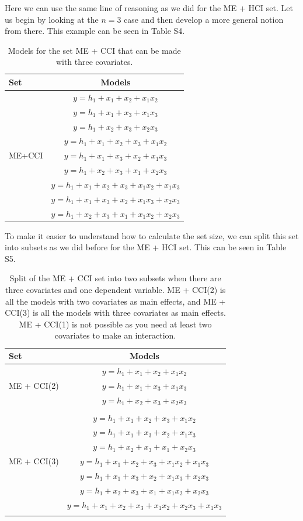 Here we can use the same line of reasoning as we did for the ME + HCI set. Let us begin by looking at the $n=3$ case and then develop a more general notion from there. This example can be seen in Table S4. 
\begin{table}{}
\centering
\caption{Models for the set ME + CCI that can be made with three covariates.}
\begin{tabular}{lc} \hline
\toprule
Set & Models \\
\midrule
\multirow{9}{*}{ME+CCI} & $y=h_1+x_1+x_2+x_1x_2$\\ & $y=h_1+x_1+x_3+x_1x_3$\\ & $y=h_1+x_2+x_3+x_2x_3$\\ & $y=h_1+x_1+x_2+x_3+x_1x_2$\\ & $y=h_1+x_1+x_3+x_2+x_1x_3$\\ & $y=h_1+x_2+x_3+x_1+x_2x_3$\\ & $y=h_1+x_1+x_2+x_3+x_1x_2+x_1x_3$\\ & $y=h_1+x_1+x_3+x_2+x_1x_3+x_2x_3$\\ & $y=h_1+x_2+x_3+x_1+x_1x_2+x_2x_3$ \\
\bottomrule
\end{tabular}
\end{table}
To make it easier to understand how to calculate the set size, we can split this set into subsets as we did before for the ME + HCI set. This can be seen in Table S5.

\begin{table}
\centering
\caption{Split of the ME + CCI set into two subsets when there are three covariates and one dependent variable. ME + CCI(2) is all the models with two covariates as main effects, and ME + CCI(3) is all the models with three covariates as main effects. ME + CCI(1) is not possible as you need at least two covariates to make an interaction.}
\begin{tabular}{lc} 
\toprule
Set & Models \\ 
\midrule
\multirow{3}{*}{ME + CCI(2)} & $y=h_1+x_1+x_2+x_1x_2$\\ & $y=h_1+x_1+x_3+x_1x_3$\\ & $y=h_1+x_2+x_3+x_2x_3$\\ &  \\  
\multirow{7}{*}{ME + CCI(3)} & $y=h_1+x_1+x_2+x_3+x_1x_2$\\ & $y=h_1+x_1+x_3+x_2+x_1x_3$\\ & $y=h_1+x_2+x_3+x_1+x_2x_3$\\ & $y=h_1+x_1+x_2+x_3+x_1x_2+x_1x_3$\\ & $y=h_1+x_1+x_3+x_2+x_1x_3+x_2x_3$\\ & $y=h_1+x_2+x_3+x_1+x_1x_2+x_2x_3$\\ & $y=h_1+x_1+x_2+x_3+x_1x_2+x_2x_3+x_1x_3$\\ & \\ 
\bottomrule
\end{tabular}
\end{table}

